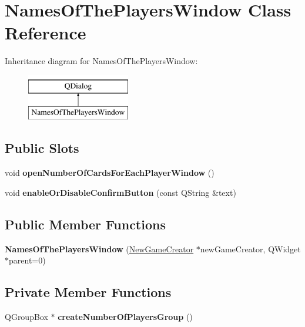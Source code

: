 \hypertarget{classNamesOfThePlayersWindow}{}\section{Names\+Of\+The\+Players\+Window Class Reference}
\label{classNamesOfThePlayersWindow}
Inheritance diagram for Names\+Of\+The\+Players\+Window\+:\begin{figure}[H]
\begin{center}
\leavevmode
\includegraphics[height=2.000000cm]{classNamesOfThePlayersWindow}
\end{center}
\end{figure}
\subsection*{Public Slots}
\begin{DoxyCompactItemize}
\item 
\mbox{\label{classNamesOfThePlayersWindow_aca0f8b0eb650053a75a0805fdc6a0012}} 
void {\bfseries open\+Number\+Of\+Cards\+For\+Each\+Player\+Window} ()
\item 
\mbox{\label{classNamesOfThePlayersWindow_ac52d684884838cb8f99a495b3c0f89d9}} 
void {\bfseries enable\+Or\+Disable\+Confirm\+Button} (const Q\+String \&text)
\end{DoxyCompactItemize}
\subsection*{Public Member Functions}
\begin{DoxyCompactItemize}
\item 
\mbox{\label{classNamesOfThePlayersWindow_a199b485baab3f42c072a33e845cd35cf}} 
{\bfseries Names\+Of\+The\+Players\+Window} (\hyperlink{classNewGameCreator}{New\+Game\+Creator} $\ast$new\+Game\+Creator, Q\+Widget $\ast$parent=0)
\end{DoxyCompactItemize}
\subsection*{Private Member Functions}
\begin{DoxyCompactItemize}
\item 
\mbox{\label{classNamesOfThePlayersWindow_a5b7448dba80a8e15e2f641bea228d38a}} 
Q\+Group\+Box $\ast$ {\bfseries create\+Number\+Of\+Players\+Group} ()
\end{DoxyCompactItemize}
